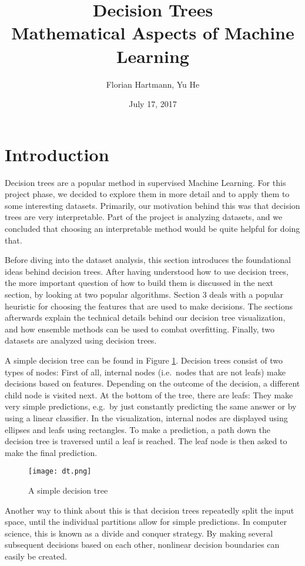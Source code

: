 \documentclass[a4paper]{article}
\title{Decision Trees\\\large{Mathematical Aspects of Machine Learning}}
\author{Florian Hartmann, Yu He}
\date{July 17, 2017}
\begin{document}
\maketitle

\section{Introduction}

Decision trees are a popular method in supervised Machine Learning. For this project phase, we decided to explore them in more detail and to apply them to some interesting datasets. Primarily, our motivation behind this was that decision trees are very interpretable. Part of the project is analyzing datasets, and we concluded that choosing an interpretable method would be quite helpful for doing that.

Before diving into the dataset analysis, this section introduces the foundational ideas behind decision trees. After having understood how to use decision trees, the more important question of how to build them is discussed in the next section, by looking at two popular algorithms. Section 3 deals with a popular heuristic for choosing the features that are used to make decisions.
The sections afterwards explain the technical details behind our decision tree visualization, and how ensemble methods can be used to combat overfitting. Finally, two datasets are analyzed using decision trees.

 A simple decision tree can be found in Figure \ref{fig:simple}. Decision trees consist of two types of nodes: First of all, internal nodes (i.e.\ nodes that are not leafs) make decisions based on features. Depending on the outcome of the decision, a different child node is visited next. At the bottom of the tree, there are leafs: They make very simple predictions, e.g.\ by just constantly predicting the same answer or by using a linear classifier. In the visualization, internal nodes are displayed using ellipses and leafs using rectangles. To make a prediction, a path down the decision tree is traversed until a leaf is reached. The leaf node is then asked to make the final prediction.

\begin{figure}
	\centering
	\texttt{[image: dt.png]}
    \caption{A simple decision tree}
    \label{fig:simple}
\end{figure}

Another way to think about this is that decision trees repeatedly split the input space, until the individual partitions allow for simple predictions. In computer science, this is known as a divide and conquer strategy. By making several subsequent decisions based on each other, nonlinear decision boundaries can easily be created.
\end{document}

